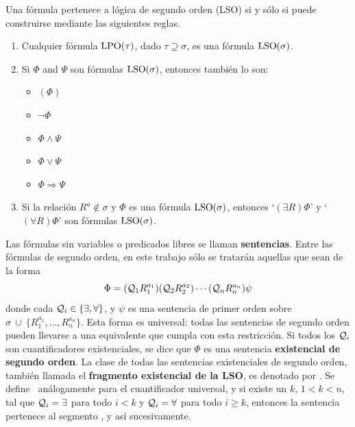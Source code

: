 \begin{definition} Una fórmula pertenece a lógica de segundo orden (LSO) si y
sólo si puede construirse mediante las siguientes reglas.
\label{lso_def}
\begin{enumerate}

\item Cualquier fórmula $\text{LPO}(\tau)$, dado $\tau\supseteq\sigma$, es una
fórmula $\text{LSO}(\sigma)$.
\item Si $\Phi$ and $\Psi$ son fórmulas $\text{LSO}(\sigma)$, entonces también lo
son:
 \begin{itemize}
    \item $(\Phi)$
    \item $\neg\Phi$
    \item $\Phi\land\Psi$
    \item $\Phi\lor\Psi$
    \item $\Phi\Rightarrow\Psi$
  \end{itemize}
\item Si la relación $R^a\notin\sigma$ y $\Phi$ es una fórmula $\text{LSO}(\sigma)$,
  entonces `$(\exists R)\Phi$' y `$(\forall R)\Phi$' son fórmulas $\text{LSO}(\sigma)$.
\end{enumerate}
\end{definition}

Las fórmulas sin variables o predicados libres se llaman \textbf{sentencias}.
Entre las fórmulas de segundo orden, en este trabajo
sólo se tratarán aquellas que sean de la forma
\[ \Phi = (\mathcal{Q}_1R_1^{a_1})(\mathcal{Q}_2R_2^{a_2})\cdots(\mathcal{Q}_nR_n^{a_n})\psi \]
donde cada $\mathcal{Q}_i \in \{\exists,\forall\}$, y
$\psi$ es una sentencia de primer orden sobre $\sigma\ \cup\ \{R_1^{a_1},\ldots,R_n^{a_n}\}$.
Esta forma es universal: todas las sentencias de segundo orden pueden llevarse
a una equivalente que cumpla con esta restricción.
Si todos los $\mathcal{Q}_i$ son cuantificadores existenciales, se dice que
$\Phi$ es una sentencia \textbf{existencial de segundo orden}.
La clase de todas las sentencias existenciales de segundo orden, también
llamada el \textbf{fragmento existencial de la LSO}, es denotado por \SOE. Se
define \SOA\ análogamente para el cuantificador universal,
y si existe un $k$, $1<k<n$, tal que $\mathcal{Q}_i=\exists$ para todo $i<k$
y $\mathcal{Q}_i=\forall$ para todo $i\geq k$, entonces la sentencia
pertenece al segmento \SOEA, y así sucesivamente.

